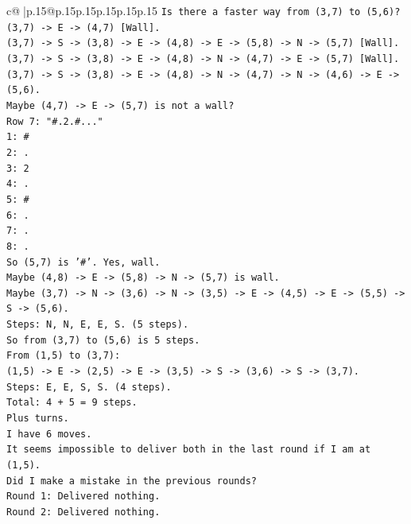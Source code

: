 \documentclass{article}
\begin{document}
{\begin{supertabular}{c@{$\;$}|p{.15\linewidth}@{}p{.15\linewidth}p{.15\linewidth}p{.15\linewidth}p{.15\linewidth}p{.15\linewidth}}
{{{\texttt{Is there a faster way from (3,7) to (5,6)?} \\
\texttt{(3,7) {-}> E {-}> (4,7) {[}Wall{]}.} \\
\texttt{(3,7) {-}> S {-}> (3,8) {-}> E {-}> (4,8) {-}> E {-}> (5,8) {-}> N {-}> (5,7) {[}Wall{]}.} \\
\texttt{(3,7) {-}> S {-}> (3,8) {-}> E {-}> (4,8) {-}> N {-}> (4,7) {-}> E {-}> (5,7) {[}Wall{]}.} \\
\texttt{(3,7) {-}> S {-}> (3,8) {-}> E {-}> (4,8) {-}> N {-}> (4,7) {-}> N {-}> (4,6) {-}> E {-}> (5,6).} \\
\texttt{Maybe (4,7) {-}> E {-}> (5,7) is not a wall?} \\
\texttt{Row 7: "\#.2.\#..."} \\
\texttt{1: \#} \\
\texttt{2: .} \\
\texttt{3: 2} \\
\texttt{4: .} \\
\texttt{5: \#} \\
\texttt{6: .} \\
\texttt{7: .} \\
\texttt{8: .} \\
\texttt{So (5,7) is '\#'. Yes, wall.} \\
\texttt{Maybe (4,8) {-}> E {-}> (5,8) {-}> N {-}> (5,7) is wall.} \\
\texttt{Maybe (3,7) {-}> N {-}> (3,6) {-}> N {-}> (3,5) {-}> E {-}> (4,5) {-}> E {-}> (5,5) {-}> S {-}> (5,6).} \\
\texttt{Steps: N, N, E, E, S. (5 steps).} \\
\texttt{So from (3,7) to (5,6) is 5 steps.} \\
\texttt{From (1,5) to (3,7):} \\
\texttt{(1,5) {-}> E {-}> (2,5) {-}> E {-}> (3,5) {-}> S {-}> (3,6) {-}> S {-}> (3,7).} \\
\texttt{Steps: E, E, S, S. (4 steps).} \\
\texttt{Total: 4 + 5 = 9 steps.} \\
\texttt{Plus turns.} \\
\texttt{I have 6 moves.} \\
\texttt{It seems impossible to deliver both in the last round if I am at (1,5).} \\
\texttt{Did I make a mistake in the previous rounds?} \\
\texttt{Round 1: Delivered nothing.} \\
\texttt{Round 2: Delivered nothing.} \\
}}}
\end{supertabular}}
\end{document}
